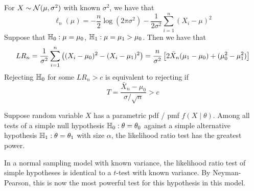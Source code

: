 \documentclass[10pt]{article}
\begin{document}
\begin{example}
	For $X \sim \mathcal{N}(\mu,\sigma^2)$ with known $\sigma^2$, we have that
	\[
	\ell_n(\mu) = - \frac{n}{2} \log (2\pi\sigma^2) - \frac{1}{2\sigma^2} \sum_{i=1}^n (X_i - \mu)^2
	\]
	Suppose that $\mathbb{H}_0:\mu = \mu_0$, $\mathbb{H}_1 : \mu = \mu_1 > \mu_0$. Then we have that
	\[
	LR_n = \frac{1}{\sigma^2} \sum_{i=1}^n \left( (X_i - \mu_0)^2 - (X_i - \mu_1)^2\right) = \frac{n}{\sigma^2} \left[ 2\bar{X}_n(\mu_1 - \mu_0) + (\mu_0^2 - \mu_1^2)\right]
	\]
	Rejecting $\mathbb{H}_0$ for some $LR_n > c$ is equivalent to rejecting if
	\[
	T = \frac{\bar{X}_n - \mu_0}{\sigma / \sqrt{n}} > c
	\]
\end{example}

\begin{theorem}
	 Suppose random variable $X$ has a parametric pdf / pmf $f(X \mid \theta)$. Among all tests of a simple null hypothesis $\mathbb{H}_0 : \theta = \theta_0$ against a simple alternative hypothesis $\mathbb{H}_1 : \theta = \theta_1$ with size $\alpha$, the likelihood ratio test has the greatest power.
\end{theorem}

\begin{remark}
	In a normal sampling model with known variance, the likelihood ratio test of simple hypotheses is identical to a $t$-test with known variance. By Neyman-Pearson, this is now the most powerful test for this hypothesis in this model.
\end{remark}
\end{document}
